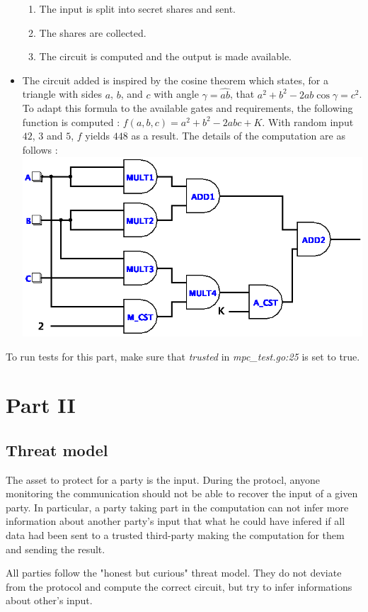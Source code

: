 \documentclass[10pt,conference]{IEEEtran}
\begin{document}
\begin{itemize}
\begin{enumerate}
            \item The input is split into secret shares and sent.
            \item The shares are collected.
            \item The circuit is computed and the output is made available.
        \end{enumerate}
    \item The circuit added is inspired by the cosine theorem which states, for a triangle with sides $a$, $b$, and $c$ with angle $\gamma = \widehat{ab}$, that $a^2 + b^2 - 2ab\cos\gamma = c^2$. To adapt this formula to the available gates and requirements, the following function is computed : $f(a,b,c) = a^2 + b^2 - 2abc + K$. With random input $42$, $3$ and $5$, $f$ yields $448$ as a result. The details of the computation are as follows :
        \includegraphics[scale=0.3]{main.png}
\end{itemize}
To run tests for this part, make sure that \textit{trusted} in \textit{mpc\_test.go:25} is set to true.

\section{Part II}
\subsection{Threat model}
The asset to protect for a party is the input. During the protocl, anyone monitoring the communication should not be able to recover the input of a given party. In particular, a party taking part in the computation can not infer more information about another party's input that what he could have infered if all data had been sent to a trusted third-party making the computation for them and sending the result.

All parties follow the "honest but curious" threat model. They do not deviate from the protocol and compute the correct circuit, but try to infer informations about other's input.
\end{document}
